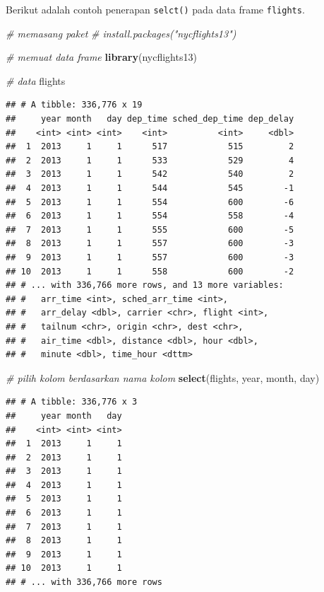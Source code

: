 \documentclass[]{book}
\newenvironment{Shaded}{\begin{snugshade}}{\end{snugshade}}
\newcommand{\KeywordTok}[1]{\textcolor[rgb]{0.13,0.29,0.53}{\textbf{#1}}}
\newcommand{\CommentTok}[1]{\textcolor[rgb]{0.56,0.35,0.01}{\textit{#1}}}
\newcommand{\NormalTok}[1]{#1}
\begin{document}
Berikut adalah contoh penerapan \texttt{selct()} pada data frame
\texttt{flights}.

\begin{Shaded}
\begin{Highlighting}[]
\CommentTok{# memasang paket}
\CommentTok{# install.packages("nycflights13")}

\CommentTok{# memuat data frame}
\KeywordTok{library}\NormalTok{(nycflights13)}

\CommentTok{# data}
\NormalTok{flights}
\end{Highlighting}
\end{Shaded}

\begin{verbatim}
## # A tibble: 336,776 x 19
##     year month   day dep_time sched_dep_time dep_delay
##    <int> <int> <int>    <int>          <int>     <dbl>
##  1  2013     1     1      517            515         2
##  2  2013     1     1      533            529         4
##  3  2013     1     1      542            540         2
##  4  2013     1     1      544            545        -1
##  5  2013     1     1      554            600        -6
##  6  2013     1     1      554            558        -4
##  7  2013     1     1      555            600        -5
##  8  2013     1     1      557            600        -3
##  9  2013     1     1      557            600        -3
## 10  2013     1     1      558            600        -2
## # ... with 336,766 more rows, and 13 more variables:
## #   arr_time <int>, sched_arr_time <int>,
## #   arr_delay <dbl>, carrier <chr>, flight <int>,
## #   tailnum <chr>, origin <chr>, dest <chr>,
## #   air_time <dbl>, distance <dbl>, hour <dbl>,
## #   minute <dbl>, time_hour <dttm>
\end{verbatim}

\begin{Shaded}
\begin{Highlighting}[]
\CommentTok{# pilih kolom berdasarkan nama kolom}
\KeywordTok{select}\NormalTok{(flights, year, month, day)}
\end{Highlighting}
\end{Shaded}

\begin{verbatim}
## # A tibble: 336,776 x 3
##     year month   day
##    <int> <int> <int>
##  1  2013     1     1
##  2  2013     1     1
##  3  2013     1     1
##  4  2013     1     1
##  5  2013     1     1
##  6  2013     1     1
##  7  2013     1     1
##  8  2013     1     1
##  9  2013     1     1
## 10  2013     1     1
## # ... with 336,766 more rows
\end{verbatim}
\end{document}
